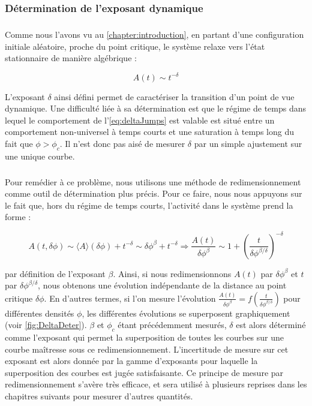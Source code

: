 \subsubsection{Détermination de l'exposant dynamique}

\subparagraph{}Comme nous l'avons vu au \autoref{chapter:introduction}, en partant d'une configuration initiale aléatoire, proche du point critique, le système relaxe vers l'état stationnaire de manière algébrique :

\begin{equation}
	A(t) \sim t^{-\delta}
	\label{eq:deltaJumps}
\end{equation}

\noindent L'exposant $\delta$ ainsi défini permet de caractériser la transition d'un point de vue dynamique. Une difficulté liée à sa détermination est que le régime de temps dans lequel le comportement de l'\autoref{eq:deltaJumps} est valable est situé entre un comportement non-universel à temps courts et une saturation à temps long du fait que $\phi>\phi_c$. Il n'est donc pas aisé de mesurer $\delta$ par un simple ajustement sur une unique courbe. 

\subparagraph{}Pour remédier à ce problème, nous utilisons une méthode de redimensionnement comme outil de détermination plus précis. Pour ce faire, nous nous appuyons sur le fait que, hors du régime de temps courts, l'activité dans le système prend la forme :

\begin{equation}
	A(t, \delta\phi) \sim \langle A \rangle (\delta\phi) + t^{-\delta} \sim \delta\phi^\beta + t^{-\delta} \Rightarrow \frac{A(t)}{\delta\phi^\beta} \sim 1 + \left(\frac{t}{\delta\phi^{\beta/\delta}}\right)^{-\delta}
\end{equation}

\noindent par définition de l'exposant $\beta$. Ainsi, si nous redimensionnons $A(t)$ par $\delta\phi^\beta$ et $t$ par $\delta\phi^{\beta/\delta}$, nous obtenons une évolution indépendante de la distance au point critique $\delta\phi$. En d'autres termes, si l'on mesure l'évolution $\frac{A(t)}{\delta\phi^\beta} = f \left(\frac{t}{\delta\phi^{\beta/\delta}} \right)$ pour différentes densités $\phi$, les différentes évolutions se superposent graphiquement (voir \autoref{fig:DeltaDeter}). $\beta$ et $\phi_c$ étant précédemment mesurés, $\delta$ est alors déterminé comme l'exposant qui permet la superposition de toutes les courbes sur une courbe maîtresse sous ce redimensionnement. L'incertitude de mesure sur cet exposant est alors donnée par la gamme d'exposants pour laquelle la superposition des courbes est jugée satisfaisante. Ce principe de mesure par redimensionnement s'avère très efficace, et sera utilisé à plusieurs reprises dans les chapitres suivants pour mesurer d'autres quantités.

